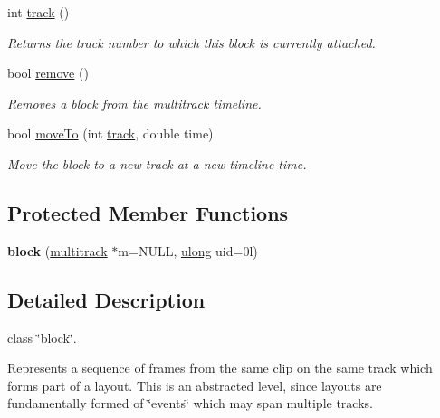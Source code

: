\begin{DoxyCompactItemize}
int \hyperlink{classlives_1_1block_abdb3133e3a7fb7cd00073295834dd6be}{track} ()
\begin{DoxyCompactList}\small\item\em Returns the track number to which this block is currently attached. \end{DoxyCompactList}\item 
bool \hyperlink{classlives_1_1block_a9127196f416f0538a53facf6838021f1}{remove} ()
\begin{DoxyCompactList}\small\item\em Removes a block from the multitrack timeline. \end{DoxyCompactList}\item 
bool \hyperlink{classlives_1_1block_a724033b908f4b2bb24dee221ec8d876f}{move\-To} (int \hyperlink{classlives_1_1block_abdb3133e3a7fb7cd00073295834dd6be}{track}, double time)
\begin{DoxyCompactList}\small\item\em Move the block to a new track at a new timeline time. \end{DoxyCompactList}\end{DoxyCompactItemize}
\subsection*{Protected Member Functions}
\begin{DoxyCompactItemize}
\item 
\hypertarget{classlives_1_1block_aa0c0cc91ad794a304116c6d42ac56108}{{\bfseries block} (\hyperlink{classlives_1_1multitrack}{multitrack} $\ast$m=N\-U\-L\-L, \hyperlink{liblives_8hpp_a718b4eb2652c286f4d42dc18a8e71a1a}{ulong} uid=0l)}\label{classlives_1_1block_aa0c0cc91ad794a304116c6d42ac56108}

\end{DoxyCompactItemize}


\subsection{Detailed Description}
class \char`\"{}block\char`\"{}. 

Represents a sequence of frames from the same clip on the same track which forms part of a layout. This is an abstracted level, since layouts are fundamentally formed of \char`\"{}events\char`\"{} which may span multiple tracks. 

